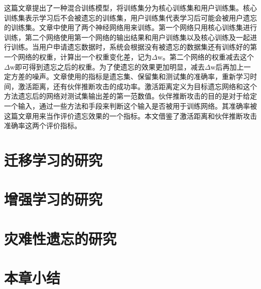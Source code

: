 这篇文章\cite{Golatkar_2021_CVPR}提出了一种混合训练模型，将训练集分为核心训练集和用户训练集。核心训练集表示学习后不会被遗忘的训练集，用户训练集代表学习后可能会被用户遗忘的训练集。文章中使用了两个神经网络用来训练。第一个网络只用核心训练集进行训练，第二个网络使用第一个网络的输出结果和用户训练集以及核心训练及一起进行训练。当用户申请遗忘数据时，系统会根据没有被遗忘的数据集还有训练好的第一个网络的权重，计算出一个权重变化差，记为$\Delta$w。第二个网络的权重减去这个$\Delta$w即可得到遗忘之后的权重。为了使遗忘的效果更加明显，减去$\Delta$w后再加上一定方差的噪声。文章使用的指标是遗忘集、保留集和测试集的准确率，重新学习时间，激活距离，还有伙伴推断攻击的成功率。激活距离定义为目标遗忘网络和这个方法遗忘后的网络对测试集输出差的第一范数值。伙伴推断攻击的目的是对于给定一个输入，通过一些方法和手段来判断这个输入是否被用于训练网络。其准确率被这篇文章用来当作评价遗忘效果的一个指标。本文借鉴了激活距离和伙伴推断攻击准确率这两个评价指标。
\section{迁移学习的研究}

\section{增强学习的研究}

\section{灾难性遗忘的研究}

\section{本章小结}
